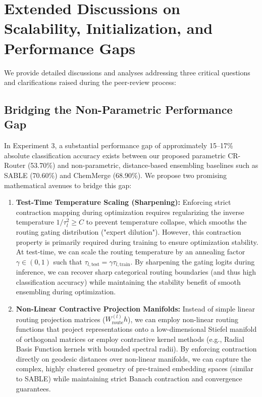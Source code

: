\documentclass{article}
\theoremstyle{plain}
\theoremstyle{definition}
\theoremstyle{remark}
\begin{document}
\section{Extended Discussions on Scalability, Initialization, and Performance Gaps}
\label{appendix:reviewer_queries}

We provide detailed discussions and analyses addressing three critical questions and clarifications raised during the peer-review process:

\subsection{Bridging the Non-Parametric Performance Gap}
In Experiment 3, a substantial performance gap of approximately 15--17\% absolute classification accuracy exists between our proposed parametric CR-Router (53.70\%) and non-parametric, distance-based ensembling baselines such as SABLE (70.60\%) and ChemMerge (68.90\%). We propose two promising mathematical avenues to bridge this gap:
\begin{enumerate}
  \item \textbf{Test-Time Temperature Scaling (Sharpening):} Enforcing strict contraction mapping during optimization requires regularizing the inverse temperature $1/\tau_l^2 \ge C$ to prevent temperature collapse, which smooths the routing gating distribution ("expert dilution"). However, this contraction property is primarily required during training to ensure optimization stability. At test-time, we can scale the routing temperature by an annealing factor $\gamma \in (0, 1)$ such that $\tau_{l, \text{test}} = \gamma \tau_{l, \text{train}}$. By sharpening the gating logits during inference, we can recover sharp categorical routing boundaries (and thus high classification accuracy) while maintaining the stability benefit of smooth ensembling during optimization.
  \item \textbf{Non-Linear Contractive Projection Manifolds:} Instead of simple linear routing projection matrices ($W_{\text{route}}^{(l)} h$), we can employ non-linear routing functions that project representations onto a low-dimensional Stiefel manifold of orthogonal matrices or employ contractive kernel methods (e.g., Radial Basis Function kernels with bounded spectral radii). By enforcing contraction directly on geodesic distances over non-linear manifolds, we can capture the complex, highly clustered geometry of pre-trained embedding spaces (similar to SABLE) while maintaining strict Banach contraction and convergence guarantees.
\end{enumerate}
\end{document}
